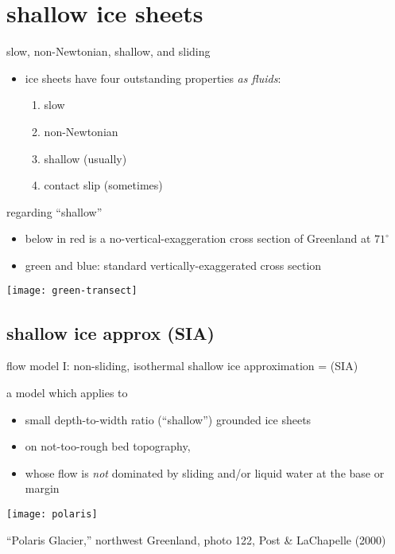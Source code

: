 
\section{shallow ice sheets}

\begin{frame}{slow, non-Newtonian, shallow, and sliding}

\begin{itemize}
\item ice sheets have four outstanding properties \emph{as fluids}:
  \begin{enumerate}
  \item slow
  \item non-Newtonian
  \item shallow (usually)
  \item contact slip (sometimes)
  \end{enumerate}
\end{itemize}
\end{frame}


\begin{frame}{regarding ``shallow''}

\begin{itemize}
\item below in \alert{red} is a no-vertical-exaggeration cross section of Greenland at $71^\circ$
\item green and blue: standard vertically-exaggerated cross section
\end{itemize}

\begin{center}
  \texttt{[image: green-transect]}
\end{center}
\end{frame}


\subsection{shallow ice approx (SIA)}

\begin{frame}{flow model I: non-sliding, isothermal shallow ice approximation = (SIA)}

a model which applies to
\begin{itemize}
\item small depth-to-width ratio (``shallow'') grounded ice sheets
\item on not-too-rough bed topography,
\item whose flow is \emph{not} dominated by sliding and/or liquid water at the base or margin
\end{itemize}

\begin{center}
  \texttt{[image: polaris]}

\tiny ``Polaris Glacier,'' northwest Greenland, photo 122, Post \& LaChapelle (2000)
\end{center}

\end{frame}


